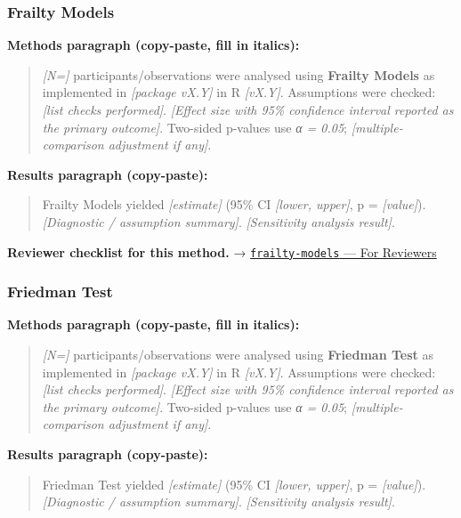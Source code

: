 \documentclass[
]{article}
\begin{document}
\subsubsection{Frailty Models}\label{frailty-models}

\textbf{Methods paragraph (copy-paste, fill in italics):}

\begin{quote}
\emph{{[}N={]}} participants/observations were analysed using
\textbf{Frailty Models} as implemented in \emph{{[}package vX.Y{]}} in R
\emph{{[}vX.Y{]}}. Assumptions were checked: \emph{{[}list checks
performed{]}}. \emph{{[}Effect size with 95\% confidence interval
reported as the primary outcome{]}}. Two-sided p-values use \emph{α =
0.05}; \emph{{[}multiple-comparison adjustment if any{]}}.
\end{quote}

\textbf{Results paragraph (copy-paste):}

\begin{quote}
Frailty Models yielded \emph{{[}estimate{]}} (95\% CI \emph{{[}lower,
upper{]}}, p = \emph{{[}value{]}}). \emph{{[}Diagnostic / assumption
summary{]}}. \emph{{[}Sensitivity analysis result{]}}.
\end{quote}

\textbf{Reviewer checklist for this method.} →
\href{../chapters/11-survival/frailty-models.Rmd\#for-reviewers}{\texttt{frailty-models}
--- For Reviewers}

\subsubsection{Friedman Test}\label{friedman-test}

\textbf{Methods paragraph (copy-paste, fill in italics):}

\begin{quote}
\emph{{[}N={]}} participants/observations were analysed using
\textbf{Friedman Test} as implemented in \emph{{[}package vX.Y{]}} in R
\emph{{[}vX.Y{]}}. Assumptions were checked: \emph{{[}list checks
performed{]}}. \emph{{[}Effect size with 95\% confidence interval
reported as the primary outcome{]}}. Two-sided p-values use \emph{α =
0.05}; \emph{{[}multiple-comparison adjustment if any{]}}.
\end{quote}

\textbf{Results paragraph (copy-paste):}

\begin{quote}
Friedman Test yielded \emph{{[}estimate{]}} (95\% CI \emph{{[}lower,
upper{]}}, p = \emph{{[}value{]}}). \emph{{[}Diagnostic / assumption
summary{]}}. \emph{{[}Sensitivity analysis result{]}}.
\end{quote}
\end{document}
